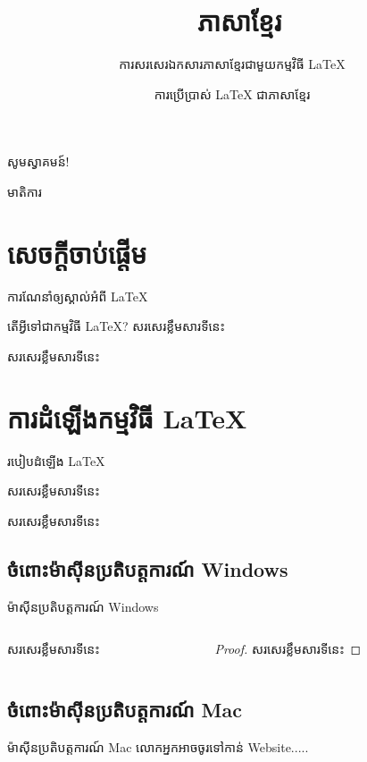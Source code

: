 \documentclass{beamer}
\title{\LaTeXe\ ភាសាខ្មែរ}
\subtitle[\LaTeX]{ការសរសេរឯកសារភាសាខ្មែរជាមួយកម្មវិធី \LaTeX}
\author[ស៊ុំ សំអុន]{ការប្រើប្រាស់ \LaTeX{} ជាភាសាខ្មែរ}
\institute{វិទ្យាស្ថានបច្ចេកវិទ្យាកម្ពុជា​}
\begin{document}
	\begin{frame}{សូមស្វាគមន៍!}
		\titlepage
	\end{frame}
	\begin{frame}{មាតិការ}
		\tableofcontents
	\end{frame}
	\section{សេចក្តីចាប់ផ្ដើម}
	\begin{frame}{ការណែនាំឲ្យស្គាល់អំពី \LaTeX{}}
		\begin{block}{តើអ្វីទៅជាកម្មវិធី \LaTeX{}?}
		សរសេរខ្លឹមសារទីនេះ
		\end{block}
		\begin{block}{}
		សរសេរខ្លឹមសារទីនេះ
		\end{block}
\end{frame}
%
	\section{ការដំឡើងកម្មវិធី \LaTeX{}}
	\begin{frame}{របៀបដំឡើង \LaTeX{}}
		\begin{definition}[កម្មវិធី \LaTeX{}]
			សរសេរខ្លឹមសារទីនេះ
		\end{definition}
		\begin{example}[ការណែនាំ]
		សរសេរខ្លឹមសារទីនេះ
		\end{example}
	\end{frame}
		\subsection{ចំពោះម៉ាស៊ីនប្រតិបត្តការណ៍ Windows}
		\begin{frame}{ម៉ាស៊ីនប្រតិបត្តការណ៍ Windows}
			\begin{columns}
				\begin{column}{0.47\textwidth}
					\begin{theorem}
						សរសេរខ្លឹមសារទីនេះ
					\end{theorem}
				\end{column}
				\begin{column}{0.47\textwidth}
					\begin{proof}
						សរសេរខ្លឹមសារទីនេះ
					\end{proof}
				\end{column}
			\end{columns}
		\end{frame}
	\subsection{ចំពោះម៉ាស៊ីនប្រតិបត្តការណ៍ Mac}
		\begin{frame}{ម៉ាស៊ីនប្រតិបត្តការណ៍ Mac}
			លោកអ្នកអាចចូរទៅកាន់ Website​.....
		\end{frame}
\end{document}
